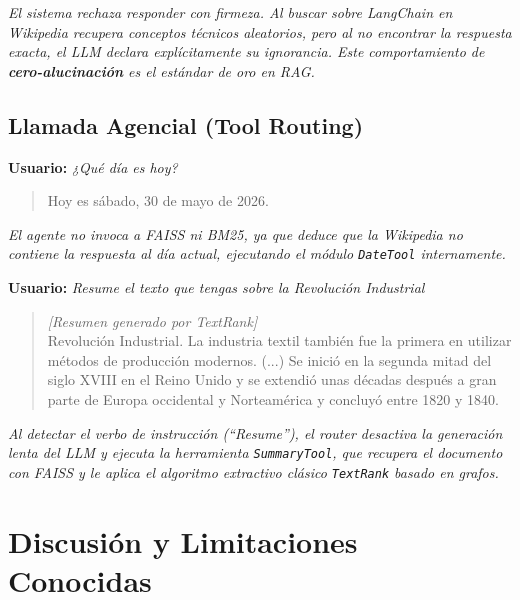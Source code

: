 \documentclass[11pt,a4paper]{article}
\newcommand{\code}[1]{\texttt{#1}}
\begin{document}
\textit{El sistema rechaza responder con firmeza. Al buscar sobre LangChain en Wikipedia recupera conceptos técnicos aleatorios, pero al no encontrar la respuesta exacta, el LLM declara explícitamente su ignorancia. Este comportamiento de \textbf{cero-alucinación} es el estándar de oro en RAG.}

\subsection{Llamada Agencial (Tool Routing)}

\textbf{Usuario:} \textit{¿Qué día es hoy?}

\begin{quote}
Hoy es sábado, 30 de mayo de 2026.
\end{quote}

\textit{El agente no invoca a FAISS ni BM25, ya que deduce que la Wikipedia no contiene la respuesta al día actual, ejecutando el módulo \code{DateTool} internamente.}

\vspace{0.3cm}
\textbf{Usuario:} \textit{Resume el texto que tengas sobre la Revolución Industrial}

\begin{quote}
\textit{[Resumen generado por TextRank]}\\
Revolución Industrial. La industria textil también fue la primera en utilizar métodos de producción modernos. (...) Se inició en la segunda mitad del siglo XVIII en el Reino Unido y se extendió unas décadas después a gran parte de Europa occidental y Norteamérica y concluyó entre 1820 y 1840.
\end{quote}

\textit{Al detectar el verbo de instrucción (``Resume''), el router desactiva la generación lenta del LLM y ejecuta la herramienta \code{SummaryTool}, que recupera el documento con FAISS y le aplica el algoritmo extractivo clásico \code{TextRank} basado en grafos.}

\section{Discusión y Limitaciones Conocidas}
\end{document}
